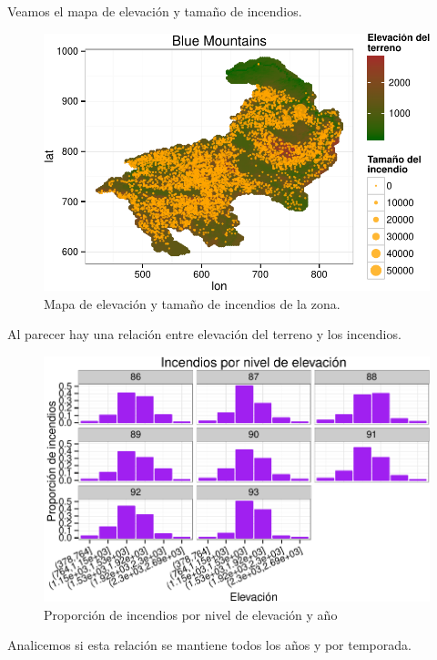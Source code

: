 \documentclass[12,]{article}
\begin{document}
Veamos el mapa de elevación y tamaño de incendios.

\begin{figure}[htbp]
\centering
\includegraphics{tarea2_files/figure-latex/unnamed-chunk-2-1.pdf}
\caption{Mapa de elevación y tamaño de incendios de la zona.}
\end{figure}

Al parecer hay una relación entre elevación del terreno y los incendios.

\begin{figure}[htbp]
\centering
\includegraphics{tarea2_files/figure-latex/unnamed-chunk-3-1.pdf}
\caption{Proporción de incendios por nivel de elevación y año}
\end{figure}

Analicemos si esta relación se mantiene todos los años y por temporada.
\end{document}
